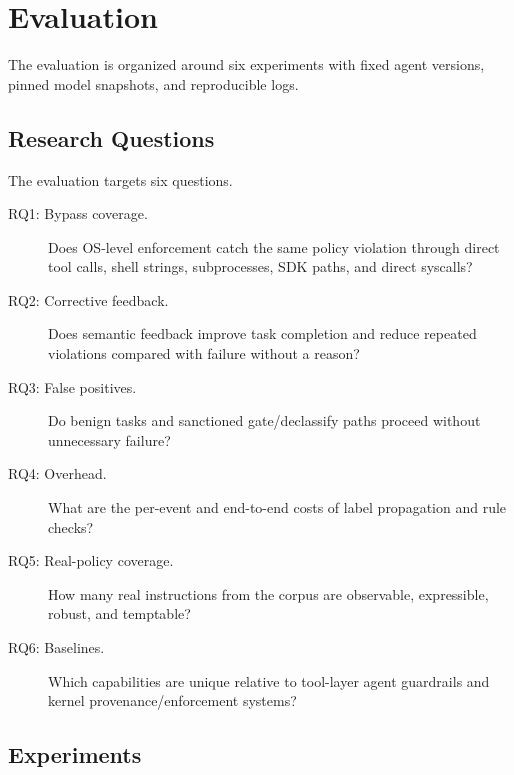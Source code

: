 \section{Evaluation}
\label{sec:evaluation}

The evaluation is organized around six experiments with fixed agent versions,
pinned model snapshots, and reproducible logs.

\subsection{Research Questions}

The evaluation targets six questions.

\begin{description}
\item[RQ1: Bypass coverage.] Does OS-level enforcement catch the same policy
violation through direct tool calls, shell strings, subprocesses, SDK paths, and
direct syscalls?
\item[RQ2: Corrective feedback.] Does semantic feedback improve task completion
and reduce repeated violations compared with failure without a reason?
\item[RQ3: False positives.] Do benign tasks and sanctioned gate/declassify
paths proceed without unnecessary failure?
\item[RQ4: Overhead.] What are the per-event and end-to-end costs of label
propagation and rule checks?
\item[RQ5: Real-policy coverage.] How many real instructions from the corpus
are observable, expressible, robust, and temptable?
\item[RQ6: Baselines.] Which capabilities are unique relative to tool-layer
agent guardrails and kernel provenance/enforcement systems?
\end{description}

\subsection{Experiments}

